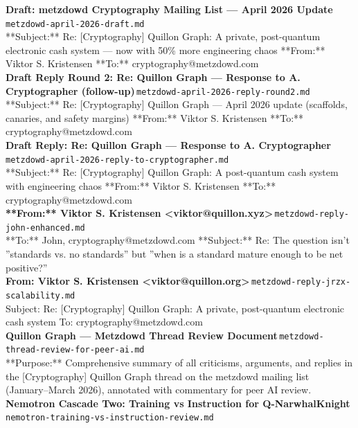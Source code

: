 \documentclass[11pt,a4paper]{article}
\begin{document}
\noindent\textbf{Draft: metzdowd Cryptography Mailing List --- April 2026 Update}\,\textcolor{qgray}{\small \texttt{metzdowd-april-2026-draft.md}}\\
**Subject:** Re: [Cryptography] Quillon Graph: A private, post-quantum electronic cash system --- now with 50\% more engineering chaos **From:** Viktor S. Kristensen **To:** cryptography@metzdowd.com\\[6pt]
\noindent\textbf{Draft Reply Round 2: Re: Quillon Graph --- Response to A. Cryptographer (follow-up)}\,\textcolor{qgray}{\small \texttt{metzdowd-april-2026-reply-round2.md}}\\
**Subject:** Re: [Cryptography] Quillon Graph --- April 2026 update (scaffolds, canaries, and safety margins) **From:** Viktor S. Kristensen **To:** cryptography@metzdowd.com\\[6pt]
\noindent\textbf{Draft Reply: Re: Quillon Graph --- Response to A. Cryptographer}\,\textcolor{qgray}{\small \texttt{metzdowd-april-2026-reply-to-cryptographer.md}}\\
**Subject:** Re: [Cryptography] Quillon Graph: A post-quantum cash system with engineering chaos **From:** Viktor S. Kristensen **To:** cryptography@metzdowd.com\\[6pt]
\noindent\textbf{**From:** Viktor S. Kristensen \textless{}viktor@quillon.xyz\textgreater{}}\,\textcolor{qgray}{\small \texttt{metzdowd-reply-john-enhanced.md}}\\
**To:** John, cryptography@metzdowd.com **Subject:** Re: The question isn't ''standards vs. no standards'' but ''when is a standard mature enough to be net positive?''\\[6pt]
\noindent\textbf{From: Viktor S. Kristensen \textless{}viktor@quillon.org\textgreater{}}\,\textcolor{qgray}{\small \texttt{metzdowd-reply-jrzx-scalability.md}}\\
Subject: Re: [Cryptography] Quillon Graph: A private, post-quantum electronic cash system To: cryptography@metzdowd.com\\[6pt]
\noindent\textbf{Quillon Graph --- Metzdowd Thread Review Document}\,\textcolor{qgray}{\small \texttt{metzdowd-thread-review-for-peer-ai.md}}\\
**Purpose:** Comprehensive summary of all criticisms, arguments, and replies in the [Cryptography] Quillon Graph thread on the metzdowd mailing list (January--March 2026), annotated with commentary for peer AI review.\\[6pt]
\noindent\textbf{Nemotron Cascade Two: Training vs Instruction for Q-NarwhalKnight}\,\textcolor{qgray}{\small \texttt{nemotron-training-vs-instruction-review.md}}\\
\end{document}
